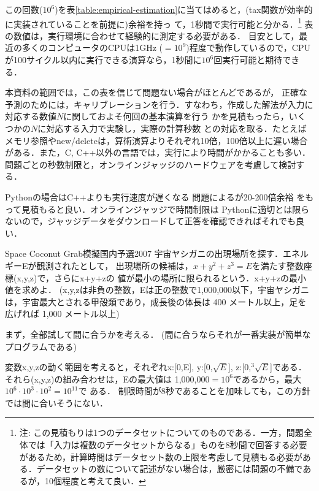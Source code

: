 この回数($10^6$)を表\ref{table:empirical-estimation}に当てはめると，(tax関数が効率的に実装されていることを前提に)余裕を持っ
て，1秒間で実行可能と分かる．\footnote{注: この見積もりは1つのデータセットについてのものである．一方，問題全体では「入力は複数のデータセットからなる」ものを8秒間で回答する必要があるため，計算時間はデータセット数の上限を考慮して見積もる必要がある．データセットの数について記述がない場合は，厳密には問題の不備であるが，10個程度と考えて良い．}
表の数値は，実行環境に合わせて経験的に測定する必要がある．
目安として，最近の多くのコンピュータのCPUは1GHz ($=10^{9}$)程度で動作しているので，CPUが100サイクル以内に実行できる演算なら，1秒間に$10^6$回実行可能と期待できる．

本資料の範囲では，この表を信じて問題ない場合がほとんどであるが，
正確な予測のためには，キャリブレーションを行う．すなわち，作成した解法が入力に対応する数値$N$に関しておよそ何回の基本演算を行う
かを見積もったら，いくつかの$N$に対応する入力で実験し，実際の計算秒数
との対応を取る．たとえばメモリ参照やnew/deleteは，算術演算よりそれぞれ10倍，100倍以上に遅い場合がある．また，C, C++以外の言語では，実行により時間がかかることも多い．問題ごとの秒数制限と，オンラインジャッジのハードウェアを考慮して検討する．

\begin{tipsbox}{Pythonの場合はC++よりも実行速度が遅くなる}
  問題によるが20-200倍余裕
  をもって見積もると良い．オンラインジャッジで時間制限は
  Pythonに適切とは限らないので，ジャッジデータをダウンロードして正答を確認できればそれでも良い．
\end{tipsbox}


\begin{pbox}{Space Coconut Grab}{模擬国内予選2007}
宇宙ヤシガニの出現場所を探す．エネルギーEが観測されたとして，
出現場所の候補は，$x+y^2+z^3=E$を満たす整数座標(x,y,z)で，さらにx+y+zの
値が最小の場所に限られるという．x+y+zの最小値を求めよ．
(x,y,zは非負の整数，Eは正の整数で1,000,000以下，宇宙ヤシガニは，宇宙最大とされる甲殻類であり，成長後の体長は 400 メートル以上，足を広げれば 1,000 メートル以上)

\end{pbox}

まず，全部試して間に合うかを考える．
(間に合うならそれが一番実装が簡単なプログラムである)

変数x,y,zの動く範囲を考えると，それぞれx:[0,E], y:[0,$\sqrt{E}$],
z:[0,${}^3\sqrt{E}$]である．それら(x,y,z)の組み合わせは，Eの最大値は
1,000,000$=10^6$であるから，最大$10^6 \cdot 10^3 \cdot 10^2=10^{11}$で
ある．
制限時間が8秒であることを加味しても，この方針では間に合いそうにない．


